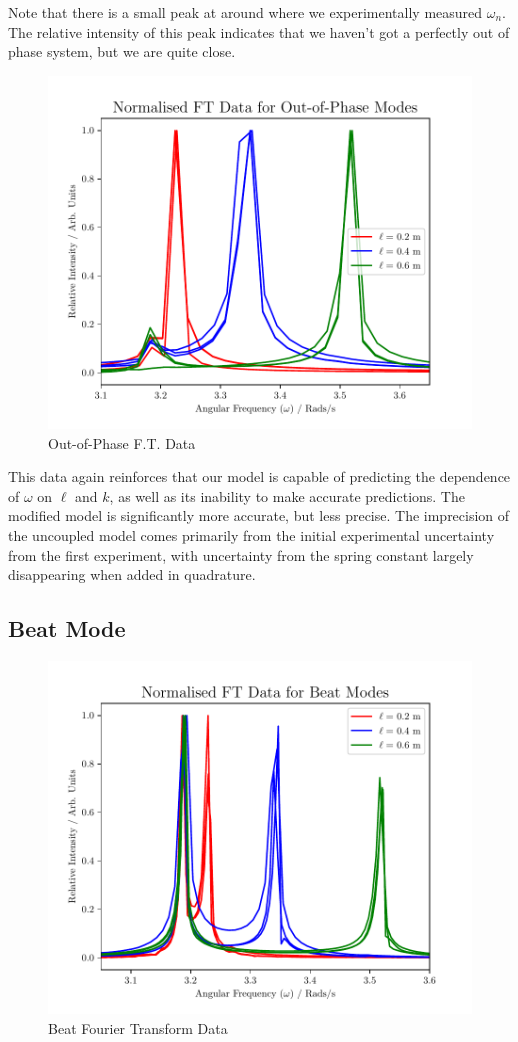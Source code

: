 \documentclass[aps,prl,reprint,10pt,amsmath,amssymb,superscriptaddress,a4paper, floatfix]{revtex4-2}
\begin{document}
Note that there is a small peak at around where we experimentally measured $ \omega_n$. The relative intensity of this peak indicates that we haven't got a perfectly out of phase system, but we are quite close.

\begin{figure}[h]
    \includegraphics[width = 8 cm]{Normalised Out-of-Phase FT Frequency Comparrison.pdf}
    \caption{Out-of-Phase F.T. Data}
    \label{fig:Out-of-Phase}
\end{figure}

This data again reinforces that our model is capable of predicting the dependence of $\omega$ on $\ell$ and $k$, as well as its inability to make accurate predictions.
\newline
The modified model is significantly more accurate, but less precise. The imprecision of the uncoupled model comes primarily from the initial experimental uncertainty from the first experiment, with uncertainty from the spring constant largely disappearing when added in quadrature.

\subsection*{Beat Mode}

\begin{figure}[h]
    \includegraphics[width = 8 cm]{Normalised Beat FT Frequency Comparrison.pdf}
    \caption{Beat Fourier Transform Data}
    \label{fig:beat}
\end{figure}
\end{document}

